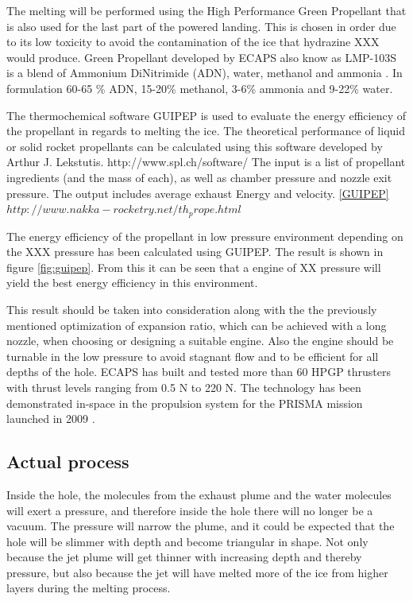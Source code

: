 The melting will be performed using the High Performance Green Propellant that is also used for the last part of the powered landing. This is chosen in order due to its low toxicity to avoid the contamination of the ice that hydrazine XXX would produce. Green Propellant developed by ECAPS also know as LMP-103S is a blend of Ammonium DiNitrimide (ADN), water, methanol and ammonia \cite{Walter_2014}. In formulation 60-65 \% ADN, 15-20\% methanol, 3-6\% ammonia and 9-22\% water. \cite{Taylor_2013}

The thermochemical software GUIPEP is used to evaluate the energy efficiency of the propellant in regards to melting the ice. The theoretical performance of liquid or solid rocket propellants can be calculated using this software developed by Arthur J. Lekstutis. http://www.spl.ch/software/ The input is a list of propellant ingredients (and the mass of each), as well as chamber pressure and nozzle exit pressure. The output includes average exhaust Energy and velocity. \ref{GUIPEP} $http://www.nakka-rocketry.net/th_prope.html$

The energy efficiency of the propellant in low pressure environment depending on the XXX pressure has been calculated using GUIPEP. The result is shown in figure \ref{fig:guipep}. From this it can be seen that a engine of XX pressure will yield the best energy efficiency in this environment. 

This result should be taken into consideration along with the the previously mentioned optimization of expansion ratio, which can be achieved with a long nozzle, when choosing or designing a suitable engine. Also the engine should be turnable in the low pressure to avoid stagnant flow and to be efficient for all depths of the hole. ECAPS has built and tested more than 60 HPGP thrusters with thrust levels ranging from 0.5 N to 220 N. The technology has been demonstrated in-space in the propulsion system for the PRISMA mission launched in 2009 \cite{Walter_2014}.

\subsection{Actual process}


Inside the hole, the molecules from the exhaust plume and the water molecules will exert a pressure, and therefore inside the hole there will no longer be a vacuum. The pressure will narrow the plume, and it could be expected that the hole will be slimmer with depth and become triangular in shape. Not only because the jet plume will get thinner with increasing depth and thereby pressure, but also because the jet will have melted more of the ice from higher layers during the melting process. 

